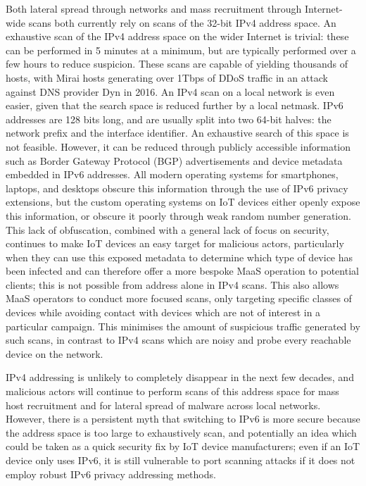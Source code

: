 \documentclass[10pt,sigconf]{acmart}
\begin{document}
Both lateral spread through networks and mass recruitment through Internet-wide scans both currently rely on scans of the 32-bit IPv4 address space.
An exhaustive scan of the IPv4 address space on the wider Internet is trivial:
these can be performed in 5 minutes at a minimum, but are typically performed over a few hours to reduce suspicion.
These scans are capable of yielding thousands of hosts, with Mirai hosts generating over 1Tbps of DDoS traffic in an attack against DNS provider Dyn in 2016.
An IPv4 scan on a local network is even easier, given that the search space is reduced further by a local netmask.
IPv6 addresses are 128 bits long, and are usually split into two 64-bit halves: the network prefix and the interface identifier.
An exhaustive search of this space is not feasible.
However, it can be reduced through publicly accessible information such as Border Gateway Protocol (BGP) advertisements and device metadata embedded in IPv6 addresses.
All modern operating systems for smartphones, laptops, and desktops obscure this information through the use of IPv6 privacy extensions, but the custom operating systems on IoT devices either openly expose this information, or obscure it poorly through weak random number generation.
This lack of obfuscation, combined with a general lack of focus on security, continues to make IoT devices an easy target for malicious actors, particularly when they can use this exposed metadata to determine which type of device has been infected and can therefore offer a more bespoke MaaS operation to potential clients;
this is not possible from address alone in IPv4 scans.
This also allows MaaS operators to conduct more focused scans, only targeting specific classes of devices while avoiding contact with devices which are not of interest in a particular campaign.
This minimises the amount of suspicious traffic generated by such scans, in contrast to IPv4 scans which are noisy and probe every reachable device on the network.

IPv4 addressing is unlikely to completely disappear in the next few decades, and malicious actors will continue to perform scans of this address space for mass host recruitment and for lateral spread of malware across local networks.
However, there is a persistent myth that switching to IPv6 is more secure because the address space is too large to exhaustively scan, and potentially an idea which could be taken as a quick security fix by IoT device manufacturers;
even if an IoT device only uses IPv6, it is still vulnerable to port scanning attacks if it does not employ robust IPv6 privacy addressing methods.
\end{document}
